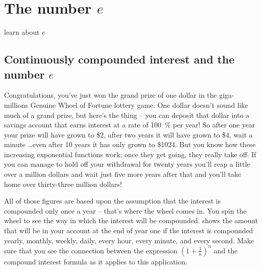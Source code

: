 \section{The number $e$}
\begin{outcomes}
	\begin{outcomelist}
		\item learn about $e$
	\end{outcomelist}
\end{outcomes}
			
\subsection*{Continuously compounded interest and the number $e$}
Congratulations, you've just won the grand prize of one dollar in the 
giga-millions Genuine Wheel of Fortune lottery game.  
One dollar doesn't sound like much of a grand prize, but here's the 
thing -- you can deposit that dollar into a savings account that earns 
interest at a rate of \SI{100}{\percent} per year!  So after one year your prize 
will have grown to \$2, after two years it will have grown to \$4, wait 
a minute \ldots  even after 10 years it has only grown to \$1024.  But 
you know how these increasing exponential functions work; once they 
get going, they really take off.  If you can manage to hold off your 
withdrawal for twenty years you'll reap a little over a million dollars and 
wait just five more years after that and you'll take home over 
thirty-three million dollars!
			
All of those figures are based upon the assumption that the 
interest is compounded only once a year -- that's where the wheel 
comes in.  You spin the wheel to see the way in which the interest 
will be compounded.   shows the amount that will 
be in your account at the end of year one if the interest is compounded 
yearly, monthly, weekly, daily, every hour, every minute, and every second.  
Make sure that you see the connection between the expression $\left( 1+\frac{1}{n} \right)^n$
and the compound interest formula as it applies to this application.
			
